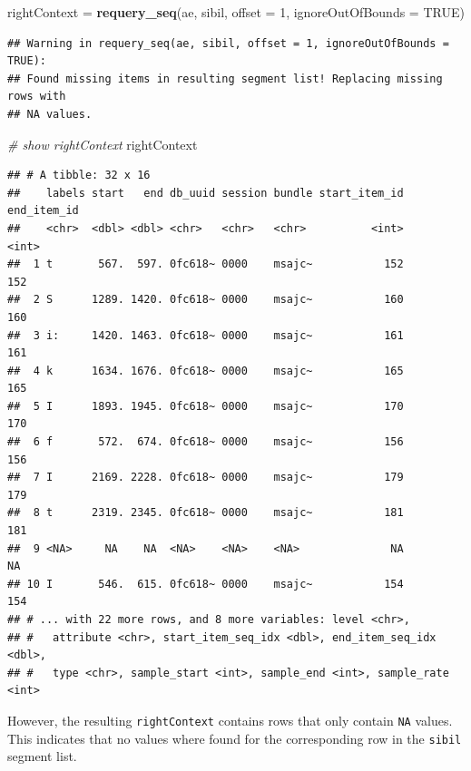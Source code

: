 \documentclass[]{book}
\newenvironment{Shaded}{\begin{snugshade}}{\end{snugshade}}
\newcommand{\CommentTok}[1]{\textcolor[rgb]{0.56,0.35,0.01}{\textit{#1}}}
\newcommand{\DataTypeTok}[1]{\textcolor[rgb]{0.13,0.29,0.53}{#1}}
\newcommand{\DecValTok}[1]{\textcolor[rgb]{0.00,0.00,0.81}{#1}}
\newcommand{\KeywordTok}[1]{\textcolor[rgb]{0.13,0.29,0.53}{\textbf{#1}}}
\newcommand{\NormalTok}[1]{#1}
\newcommand{\OtherTok}[1]{\textcolor[rgb]{0.56,0.35,0.01}{#1}}
\newcommand{\StringTok}[1]{\textcolor[rgb]{0.31,0.60,0.02}{#1}}
\begin{document}
\begin{Shaded}
\begin{Highlighting}[]
\NormalTok{rightContext =}\StringTok{ }\KeywordTok{requery_seq}\NormalTok{(ae, sibil,}
                           \DataTypeTok{offset =} \DecValTok{1}\NormalTok{,}
                           \DataTypeTok{ignoreOutOfBounds =} \OtherTok{TRUE}\NormalTok{)}
\end{Highlighting}
\end{Shaded}

\begin{verbatim}
## Warning in requery_seq(ae, sibil, offset = 1, ignoreOutOfBounds = TRUE):
## Found missing items in resulting segment list! Replacing missing rows with
## NA values.
\end{verbatim}

\begin{Shaded}
\begin{Highlighting}[]
\CommentTok{# show rightContext}
\NormalTok{rightContext}
\end{Highlighting}
\end{Shaded}

\begin{verbatim}
## # A tibble: 32 x 16
##    labels start   end db_uuid session bundle start_item_id end_item_id
##    <chr>  <dbl> <dbl> <chr>   <chr>   <chr>          <int>       <int>
##  1 t       567.  597. 0fc618~ 0000    msajc~           152         152
##  2 S      1289. 1420. 0fc618~ 0000    msajc~           160         160
##  3 i:     1420. 1463. 0fc618~ 0000    msajc~           161         161
##  4 k      1634. 1676. 0fc618~ 0000    msajc~           165         165
##  5 I      1893. 1945. 0fc618~ 0000    msajc~           170         170
##  6 f       572.  674. 0fc618~ 0000    msajc~           156         156
##  7 I      2169. 2228. 0fc618~ 0000    msajc~           179         179
##  8 t      2319. 2345. 0fc618~ 0000    msajc~           181         181
##  9 <NA>     NA    NA  <NA>    <NA>    <NA>              NA          NA
## 10 I       546.  615. 0fc618~ 0000    msajc~           154         154
## # ... with 22 more rows, and 8 more variables: level <chr>,
## #   attribute <chr>, start_item_seq_idx <dbl>, end_item_seq_idx <dbl>,
## #   type <chr>, sample_start <int>, sample_end <int>, sample_rate <int>
\end{verbatim}

However, the resulting \texttt{rightContext} contains rows that only contain \texttt{NA} values. This indicates that no values where found for the corresponding row in the \texttt{sibil} segment list.
\end{document}
